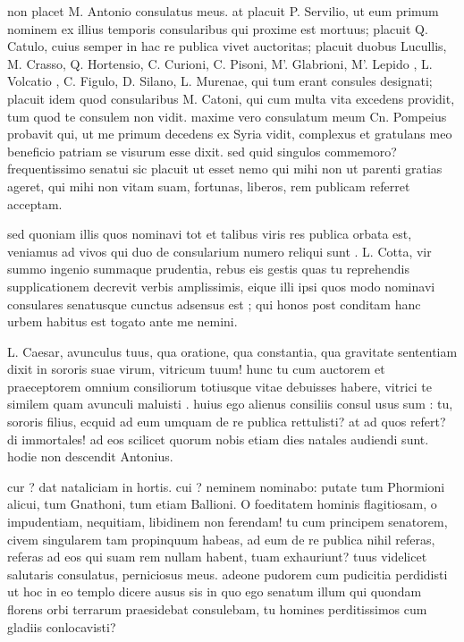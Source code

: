  non placet M. Antonio consulatus meus. at placuit P. Servilio, ut eum primum nominem ex illius temporis consularibus qui proxime est mortuus; placuit Q. Catulo, cuius semper in hac re publica vivet auctoritas; placuit duobus Lucullis, M. Crasso, Q. Hortensio, C. Curioni, C. Pisoni, M'. Glabrioni, M'. Lepido , L. Volcatio , C. Figulo, D. Silano, L. Murenae, qui tum erant consules designati; placuit idem quod consularibus M. Catoni, qui cum multa vita excedens providit, tum quod te consulem non vidit. maxime vero consulatum meum Cn. Pompeius probavit qui, ut me primum decedens ex Syria vidit, complexus et gratulans meo beneficio patriam se visurum esse dixit. sed quid singulos commemoro? frequentissimo senatui sic placuit ut esset nemo qui mihi non ut parenti gratias ageret, qui mihi non vitam suam, fortunas, liberos, rem publicam referret acceptam.

 sed quoniam illis quos nominavi tot et talibus viris res publica orbata est, veniamus ad vivos qui duo de consularium numero reliqui sunt . L. Cotta, vir summo ingenio summaque prudentia, rebus eis gestis quas tu reprehendis supplicationem decrevit verbis amplissimis, eique illi ipsi quos modo nominavi consulares senatusque cunctus adsensus est ; qui honos post conditam hanc urbem habitus est togato ante me nemini.

 L. Caesar, avunculus tuus, qua oratione, qua constantia, qua gravitate sententiam dixit in sororis suae virum, vitricum tuum! hunc tu cum auctorem et praeceptorem omnium consiliorum totiusque vitae debuisses habere, vitrici te similem quam avunculi maluisti . huius ego alienus consiliis consul usus sum : tu, sororis filius, ecquid ad eum umquam de re publica rettulisti? at ad quos refert? di immortales! ad eos scilicet quorum nobis etiam dies natales audiendi sunt. hodie non descendit Antonius.

 cur ? dat nataliciam in hortis. cui ? neminem nominabo: putate tum Phormioni alicui, tum Gnathoni, tum etiam Ballioni. O foeditatem hominis flagitiosam, o impudentiam, nequitiam, libidinem non ferendam! tu cum principem senatorem, civem singularem tam propinquum habeas, ad eum de re publica nihil referas, referas ad eos qui suam rem nullam habent, tuam exhauriunt? tuus videlicet salutaris consulatus, perniciosus meus. adeone pudorem cum pudicitia perdidisti ut hoc in eo templo dicere ausus sis in quo ego senatum illum qui quondam florens orbi terrarum praesidebat consulebam, tu homines perditissimos cum gladiis conlocavisti?

